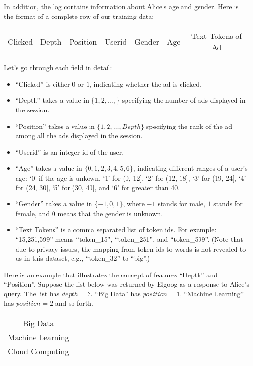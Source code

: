 \documentclass[12pt]{article}
\begin{document}
{In addition, the log contains information about Alice's age and gender. Here is the format of a complete row of our training data:
\begin{center}
  \begin{tabular}[h]{c|c|c|c|c|c|c}
  Clicked & Depth & Position & Userid & Gender & Age & Text Tokens of Ad \\
  \end{tabular}
\end{center}
Let's go through each field in detail:
\begin{itemize}
  \item ``Clicked'' is either $0$ or $1$, indicating whether the ad is clicked.
  \item ``Depth'' takes a value in $\{1,2,\dots, \}$ specifying the number of ads displayed in the session.
  \item ``Position'' takes a value in $\{1,2,\dots, Depth\}$ specifying the rank of the ad among all the ads displayed in the session.
  \item ``Userid'' is an integer id of the user.
  \item ``Age'' takes a value in $\{0, 1,2,3,4,5,6\}$, indicating different ranges of a user's age: `0' if the age is unkown, `1' for (0, 12], `2' for (12, 18], `3' for (19, 24], `4' for (24, 30], `5' for (30, 40], and `6' for greater than 40.
  \item ``Gender'' takes a value in $\{-1, 0, 1\}$, where $-1$ stands for male, $1$ stands for female, and $0$ means that the gender is unknown.
  \item ``Text Tokens'' is a comma separated list of token ids. For example: ``15,251,599'' means ``token\_15'', ``token\_251'', and ``token\_599''. (Note that due to privacy issues, the mapping from token ids to words is not revealed to us in this dataset, e.g., ``token\_32'' to ``big''.) 
\end{itemize}
Here is an example that illustrates the concept of features ``Depth'' and ``Position''.
Suppose the list below was returned by Elgoog as a response to Alice's query. 
The list has $depth = 3$. ``Big Data'' has $position = 1$, ``Machine Learning'' has $position = 2$ and so forth. \\
\begin{center}
  \begin{tabular}{:c:}
    \hdashline
    Big Data \\
    \hdashline 
    Machine Learning \\
    \hdashline
    Cloud Computing \\
    \hdashline
  \end{tabular}
\end{center}

}
\end{document}
